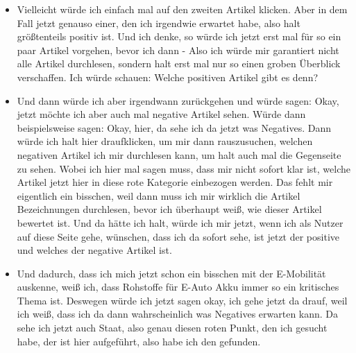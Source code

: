{\begin{itemize}[]
                  Einfach den Ersten.
                  \flqq Stromverbrauch: So viel verbraucht ein E-Auto wirklich\frqq{} und dann würde ich mir den halt angucken.
                  Okay, und hier sehe ich jetzt auch noch mal genau, zu welchen Kategorien der Artikel gehört, was natürlich cool ist.
                  Und dann sehe ich auch okay, jetzt habe ich auch genau so einen erwischt, wie ich eigentlich erwartet habe, der in allen Fällen positiv ist.
                  Ich würde mir den durchlesen und dann halt wieder zurück zu der Übersicht gehen und mich so ein bisschen durcharbeiten.
            \item {} Vielleicht würde ich einfach mal auf den zweiten Artikel klicken.
                  Aber in dem Fall jetzt genauso einer, den ich irgendwie erwartet habe, also halt größtenteils positiv ist.
                  Und ich denke, so würde ich jetzt erst mal für so ein paar Artikel vorgehen, bevor ich dann - Also ich würde mir garantiert nicht alle Artikel durchlesen, sondern halt erst mal nur so einen groben Überblick verschaffen.
                  Ich würde schauen: Welche positiven Artikel gibt es denn?
            \item {} Und dann würde ich aber irgendwann zurückgehen und würde sagen: Okay, jetzt möchte ich aber auch mal negative Artikel sehen.
                  Würde dann beispielsweise sagen: Okay, hier, da sehe ich da jetzt was Negatives.
                  Dann würde ich halt hier draufklicken, um mir dann rauszusuchen, welchen negativen Artikel ich mir durchlesen kann, um halt auch mal die Gegenseite zu sehen.
                  Wobei ich hier mal sagen muss, dass mir nicht sofort klar ist, welche Artikel jetzt hier in diese rote Kategorie einbezogen werden.
                  Das fehlt mir eigentlich ein bisschen, weil dann muss ich mir wirklich die Artikel Bezeichnungen durchlesen, bevor ich überhaupt weiß, wie dieser Artikel bewertet ist.
                  Und da hätte ich halt, würde ich mir jetzt, wenn ich als Nutzer auf diese Seite gehe, wünschen, dass ich da sofort sehe, ist jetzt der positive und welches der negative Artikel ist.
            \item {} Und dadurch, dass ich mich jetzt schon ein bisschen mit der E-Mobilität auskenne, weiß ich, dass Rohstoffe für E-Auto Akku immer so ein kritisches Thema ist.
                  Deswegen würde ich jetzt sagen okay, ich gehe jetzt da drauf, weil ich weiß, dass ich da dann wahrscheinlich was Negatives erwarten kann.
                  Da sehe ich jetzt auch Staat, also genau diesen roten Punkt, den ich gesucht habe, der ist hier aufgeführt, also habe ich den gefunden.

\end{itemize}}

